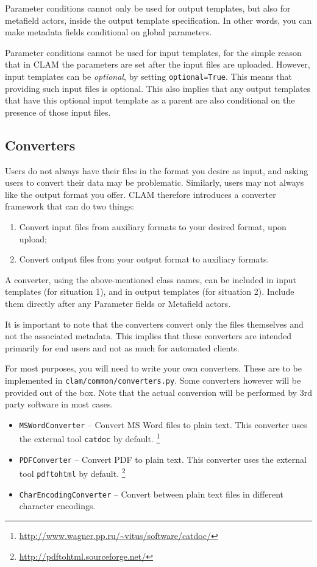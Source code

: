 \documentclass[a4paper,12pt,twoside,openright]{report}
\begin{document}
Parameter conditions cannot only be used for output templates, but also
for metafield actors, inside the output template specification. In other
words, you can make metadata fields conditional on global parameters.

Parameter conditions cannot be used for input templates, for the simple
reason that in CLAM the parameters are set after the input files are uploaded.
However, input templates can be \emph{optional}, by setting
\texttt{optional=True}. This means that providing such input files is optional.
This also implies that any output templates that have this optional input
template as a parent are also conditional on the presence of those input files.


\subsection{Converters}

Users do not always have their files in the format you desire as input, and
asking users to convert their data may be problematic. Similarly, users may not
always like the output format you offer. CLAM therefore introduces a converter
framework that can do two things:

\begin{enumerate}
\item Convert input files from auxiliary formats to your desired format, upon upload;
\item Convert output files from your output format to auxiliary formats.
\end{enumerate}

A converter, using the above-mentioned class names, can be included in input
templates (for situation 1), and in output templates (for situation 2). Include
them directly after any Parameter fields or Metafield actors.

It is important to note that the converters convert only the files themselves
and not the associated metadata. This implies that these converters are
intended primarily for end users and not as much for automated clients.

For most purposes, you will need to write your own converters. These are to be
implemented in \texttt{clam/common/converters.py}. Some converters however will
be provided out of the box. Note that the actual conversion will be performed
by 3rd party software in most cases.

\begin{itemize}
\item \texttt{MSWordConverter} -- Convert MS Word files to plain text. This
  converter uses the external tool \texttt{catdoc} by default.
  \footnote{\url{http://www.wagner.pp.ru/~vitus/software/catdoc/}}
\item \texttt{PDFConverter} -- Convert PDF to plain text. This converter uses
  the external tool \texttt{pdftohtml} by default. \footnote{\url{http://pdftohtml.sourceforge.net/}}
\item \texttt{CharEncodingConverter} -- Convert between plain text files in
  different character encodings.
\end{itemize}
\end{document}
